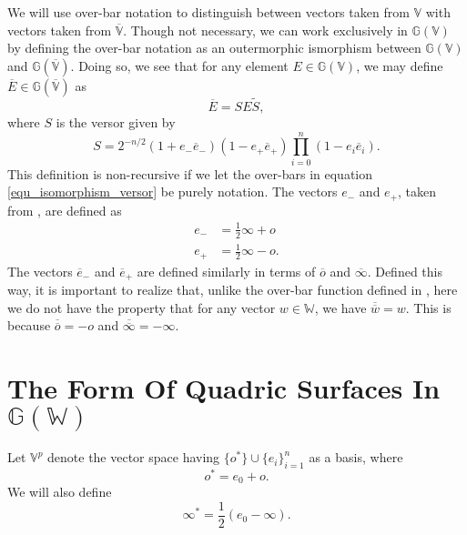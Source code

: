 \documentclass{birkjour}
\theoremstyle{definition}
\theoremstyle{remark}
\numberwithin{equation}{section}
\newcommand{\G}{\mathbb{G}}
\newcommand{\V}{\mathbb{V}}
\newcommand{\Vb}{\mathbb{\overline{V}}}
\newcommand{\W}{\mathbb{W}}
\newcommand{\nvao}{o}
\newcommand{\nvai}{\infty}
\newcommand{\nvaob}{\overline{o}}
\newcommand{\nvaib}{\overline{\infty}}
\newcommand{\eminus}{e_{-}}
\newcommand{\eplus}{e_{+}}
\newcommand{\eminusb}{\overline{e}_{-}}
\newcommand{\eplusb}{\overline{e}_{+}}
\begin{document}
We will use over-bar notation to distinguish between vectors taken from $\V$
with vectors taken from $\Vb$.  Though not necessary, we can work exclusively
in $\G(\V)$ by defining the over-bar notation as an outermorphic ismorphism between
$\G(\V)$ and $\G(\Vb)$.  Doing so, we see that for any element $E\in\G(\V)$,
we may define $\overline{E}\in\G(\Vb)$ as
\begin{equation}
\overline{E} = SE\tilde{S},
\end{equation}
where $S$ is the versor given by
\begin{equation}\label{equ_isomorphism_versor}
S = 2^{-n/2}(1+\eminus\eminusb)(1-\eplus\eplusb)\prod_{i=0}^n(1-e_i\overline{e}_i).
\end{equation}
This definition is non-recursive if we let the over-bars in equation \eqref{equ_isomorphism_versor}
be purely notation.  The vectors $\eminus$ and $\eplus$, taken from \cite{LiRockwood},
are defined as
\begin{align}
\eminus &= \frac{1}{2}\nvai + \nvao \\
\eplus &= \frac{1}{2}\nvai - \nvao.
\end{align}
The vectors $\eminusb$ and $\eplusb$ are defined similarly in terms of $\nvaob$ and $\nvaib$.
Defined this way, it is important to realize that, unlike the over-bar function defined in \cite{Parkin12},
here we do not have the property that for any vector $w\in\W$, we have $\overline{\overline{w}}=w$.
This is because $\overline{\nvaob}=-\nvao$ and $\overline{\nvaib}=-\nvai$.

\section{The Form Of Quadric Surfaces In $\G(\W)$}

Let $\V^p$ denote the vector space having $\{\nvao^*\}\cup\{e_i\}_{i=1}^n$ as
a basis, where
\begin{equation}
\nvao^*=e_0+\nvao.
\end{equation}
We will also define
\begin{equation}
\nvai^*=\frac{1}{2}(e_0-\nvai).
\end{equation}
\end{document}
